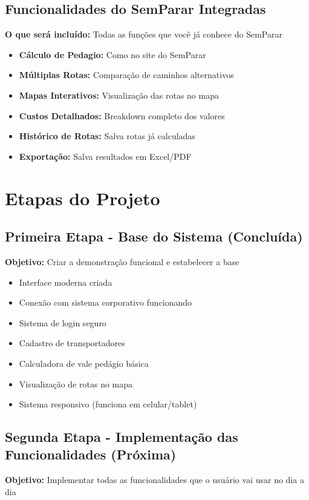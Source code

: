 \documentclass[12pt,a4paper]{article}
\begin{document}
\subsection{Funcionalidades do SemParar Integradas}
\textbf{O que será incluído:} Todas as funções que você já conhece do SemParar
\begin{itemize}
    \item \textbf{Cálculo de Pedagio:} Como no site do SemParar
    \item \textbf{Múltiplas Rotas:} Comparação de caminhos alternativos
    \item \textbf{Mapas Interativos:} Visualização das rotas no mapa
    \item \textbf{Custos Detalhados:} Breakdown completo dos valores
    \item \textbf{Histórico de Rotas:} Salva rotas já calculadas
    \item \textbf{Exportação:} Salva resultados em Excel/PDF
\end{itemize}

\section{Etapas do Projeto}

\subsection{Primeira Etapa - Base do Sistema (Concluída)}
\textbf{Objetivo:} Criar a demonstração funcional e estabelecer a base
\begin{itemize}[leftmargin=3cm]
    \item[\checkmark] Interface moderna criada
    \item[\checkmark] Conexão com sistema corporativo funcionando
    \item[\checkmark] Sistema de login seguro
    \item[\checkmark] Cadastro de transportadores
    \item[\checkmark] Calculadora de vale pedágio básica
    \item[\checkmark] Visualização de rotas no mapa
    \item[\checkmark] Sistema responsivo (funciona em celular/tablet)
\end{itemize}

\subsection{Segunda Etapa - Implementação das Funcionalidades (Próxima)}
\textbf{Objetivo:} Implementar todas as funcionalidades que o usuário vai usar no dia a dia
\end{document}
